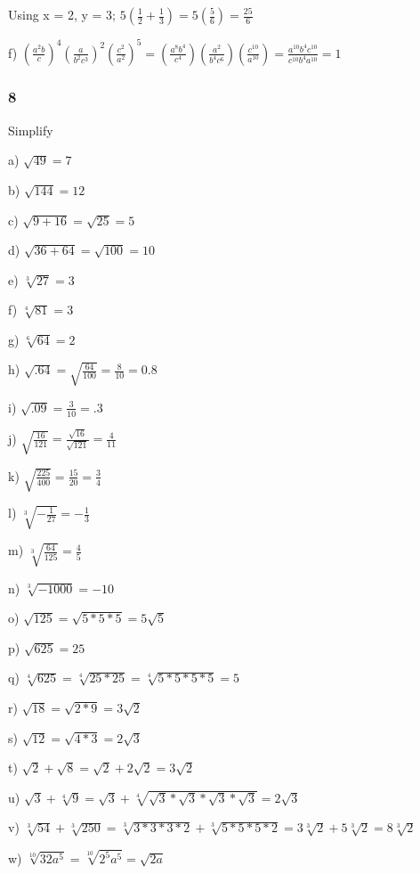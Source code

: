 \documentclass[]{report}
\begin{document}
Using x = 2, y = 3;
$5 (\frac{1}{2}+\frac{1}{3}) = 5 (\frac{5}{6}) = \frac{25}{6}$

f)  $(\frac{a^2b}{c})^4(\frac{a}{b^2c^3})^2(\frac{c^2}{a^2})^5 = (\frac{a^8b^4}{c^4})(\frac{a^2}{b^4c^6})(\frac{c^{10}}{a^{10}}) = \frac{a^{10}b^4c^{10}}{c^{10}b^4a^{10}} = 1$ \\


\subsubsection{8}
Simplify


a) $\sqrt{49} = 7$


b) $\sqrt{144} = 12$

c) $\sqrt{9  + 16} = \sqrt{25} = 5$

d) $\sqrt{36+ 64} = \sqrt{100} = 10$

e) $\sqrt[3]{27} = 3$

f) $\sqrt[4]{81} = 3$

g) $\sqrt[6]{64} = 2$

h) $\sqrt{.64} = \sqrt{\frac{64}{100}} = \frac{8}{10} = 0.8$

i) $\sqrt{.09} = \frac{3}{10} = .3$

j) $\sqrt{\frac{16}{121}} = \frac{\sqrt{16}}{\sqrt{121}} = \frac{4}{11}$

k) $\sqrt{\frac{225}{400}} = \frac{15}{20} = \frac{3}{4}$

l) $\sqrt[3]{-\frac{1}{27}} = -\frac{1}{3}$

m) $\sqrt[3]{\frac{64}{125}} = \frac{4}{5}$

n) $\sqrt[3]{-1000} = -10$ 

o) $\sqrt{125} = \sqrt{5 * 5 * 5} = 5\sqrt{5}$

p) $\sqrt{625} = 25$

q) $\sqrt[4]{625} = \sqrt[4]{25 * 25} = \sqrt[4]{5 * 5 * 5 * 5} = 5$

r) $\sqrt{18} = \sqrt{2 * 9} = 3\sqrt{2}$

s) $\sqrt{12} = \sqrt{4 * 3} = 2\sqrt{3}$

t) $\sqrt{2} + \sqrt{8} = \sqrt{2} + 2\sqrt{2} = 3\sqrt{2}$

u) $\sqrt{3} + \sqrt[4]{9} =  \sqrt{3} + \sqrt[4]{\sqrt{3} * \sqrt{3} * \sqrt{3} * \sqrt{3}} = 2\sqrt{3} $

v) $\sqrt[3]{54} + \sqrt[3]{250} = \sqrt[3]{3 * 3 * 3 * 2 } + \sqrt[3]{5 * 5 * 5 *2} = 3\sqrt[3]{2} + 5\sqrt[3]{2}  = 8\sqrt[3]2$

w) $\sqrt[10]{32a^5} = \sqrt[10]{2^5a^5} = \sqrt{2a}$
\end{document}
